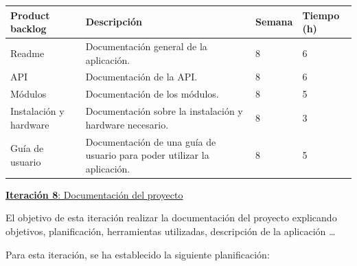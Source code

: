 \begin{table}[h!]
\begin{tabular}{|p{4cm}|p{7.2cm}|p{1.3cm}|p{2.1cm}|}
\hline
\rowcolor[HTML]{9B9B9B} 
{\color[HTML]{FFFFFF} Product backlog} & {\color[HTML]{FFFFFF} Descripción}                                  & {\color[HTML]{FFFFFF} Semana} & {\color[HTML]{FFFFFF}Tiempo (h)} \\ \hline

Readme                          & Documentación general de la aplicación.
                                        & 8                            & 6                                   \\ \hline
          
API                         &  Documentación de la API.
          & 8                             & 6                                   \\ \hline

Módulos & Documentación de los módulos.

          & 8                             & 5                                   \\ \hline

Instalación y hardware                        & Documentación sobre la instalación y hardware necesario.
          & 8                             & 3                                  \\ \hline
        
Guía de usuario                        & Documentación de una guía de usuario para poder utilizar la aplicación.
          & 8                             & 5                                  \\ \hline

\end{tabular}
\end{table}

\newpage


\large{\underline{\textbf{Iteración 8}: Documentación del proyecto}}
\vspace{0.3cm}

\normalsize

El objetivo de esta iteración realizar la documentación del proyecto explicando objetivos, planificación, herramientas utilizadas, descripción de la aplicación \ldots

Para esta iteración, se ha establecido la siguiente planificación:

